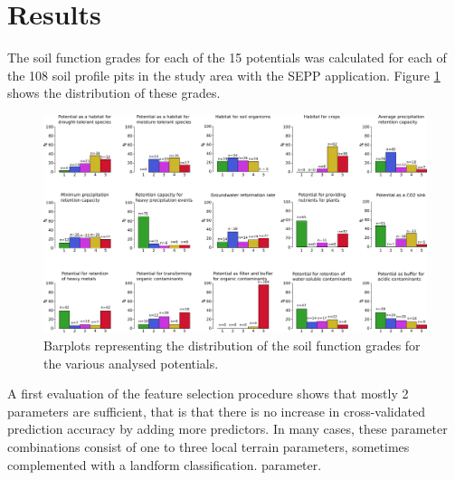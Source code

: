 \documentclass[soilsystems,article,submit,moreauthors,pdftex,10pt,a4paper]{Definitions/mdpi}
\begin{document}
\section{Results}
The soil function grades for each of the 15 potentials was calculated for each of the 108 soil profile pits in the study area with the SEPP application. Figure \ref{fig:SFdistro} shows the distribution of these grades.
 \begin{figure}[ht!]
\includegraphics[width=\textwidth,angle=0]{soilfunctiondistro_newn.pdf}
\caption{Barplots representing the distribution of the soil function grades for the various analysed potentials. }
\label{fig:SFdistro}
\end{figure}
A first evaluation of the feature selection procedure shows that mostly 2 parameters are sufficient, that is that there is no increase in cross-validated prediction accuracy  by adding more predictors. In many cases, these parameter combinations consist of one to three local terrain parameters, sometimes complemented with a landform classification. parameter.
\end{document}
